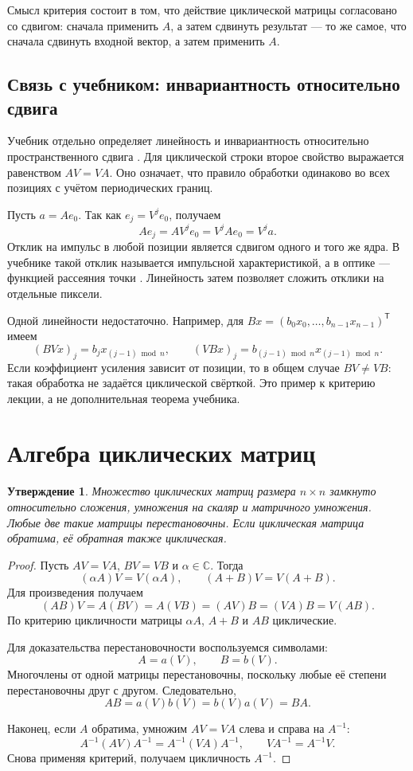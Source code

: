 \documentclass[12pt,a4paper]{article}
\newtheorem{proposition}{Утверждение}
\theoremstyle{definition}
\theoremstyle{remark}
\newcommand{\CC}{\mathbb{C}}
\begin{document}
Смысл критерия состоит в том, что действие циклической матрицы согласовано
со сдвигом: сначала применить $A$, а затем сдвинуть результат --- то же
самое, что сначала сдвинуть входной вектор, а затем применить $A$.

\subsection{Связь с учебником: инвариантность относительно сдвига}

Учебник отдельно определяет линейность и инвариантность относительно
пространственного сдвига \cite[\S\,5.5, с.~403--405]{GW2012}.
Для циклической строки второе свойство выражается равенством
$AV=VA$. Оно означает, что правило обработки одинаково во всех
позициях с учётом периодических границ.

Пусть $a=Ae_0$. Так как $e_j=V^je_0$, получаем
\[
  Ae_j=AV^je_0=V^jAe_0=V^ja.
\]
Отклик на импульс в любой позиции является сдвигом одного
и того же ядра. В учебнике такой отклик называется импульсной
характеристикой, а в оптике --- функцией рассеяния точки
\cite[\S\,5.5, с.~405]{GW2012}.
Линейность затем позволяет сложить отклики на отдельные пиксели.

Одной линейности недостаточно. Например, для
$Bx=(b_0x_0,\ldots,b_{n-1}x_{n-1})^{\mathsf T}$ имеем
\[
  (BVx)_j=b_jx_{(j-1)\bmod n},\qquad
  (VBx)_j=b_{(j-1)\bmod n}x_{(j-1)\bmod n}.
\]
Если коэффициент усиления зависит от позиции, то в общем случае
$BV\ne VB$: такая обработка не задаётся циклической свёрткой.
Это пример к критерию лекции, а не дополнительная теорема учебника.

\section{Алгебра циклических матриц}

\begin{proposition}
Множество циклических матриц размера $n\times n$ замкнуто относительно
сложения, умножения на скаляр и матричного умножения. Любые две такие
матрицы перестановочны. Если циклическая матрица обратима, её обратная
также циклическая.
\end{proposition}

\begin{proof}
Пусть $AV=VA$, $BV=VB$ и $\alpha\in\CC$. Тогда
\[
  (\alpha A)V=V(\alpha A),\qquad
  (A+B)V=V(A+B).
\]
Для произведения получаем
\[
  (AB)V=A(BV)=A(VB)=(AV)B=(VA)B=V(AB).
\]
По критерию цикличности матрицы $\alpha A$, $A+B$ и $AB$ циклические.

Для доказательства перестановочности воспользуемся символами:
\[
  A=a(V),\qquad B=b(V).
\]
Многочлены от одной матрицы перестановочны, поскольку любые её степени
перестановочны друг с другом. Следовательно,
\[
  AB=a(V)b(V)=b(V)a(V)=BA.
\]

Наконец, если $A$ обратима, умножим $AV=VA$ слева и справа на $A^{-1}$:
\[
  A^{-1}(AV)A^{-1}=A^{-1}(VA)A^{-1},
  \qquad VA^{-1}=A^{-1}V.
\]
Снова применяя критерий, получаем цикличность $A^{-1}$.
\end{proof}
\end{document}
